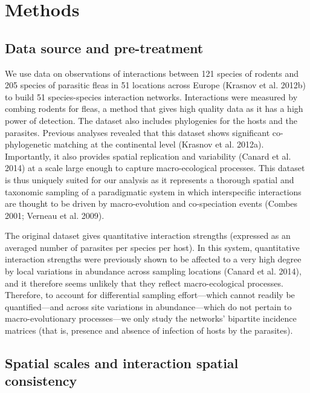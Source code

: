 \documentclass[12pt]{article}
\begin{document}
\section{Methods}\label{methods}

\subsection{Data source and
pre-treatment}\label{data-source-and-pre-treatment}

We use data on observations of interactions between 121 species of
rodents and 205 species of parasitic fleas in 51 locations across Europe
(Krasnov et al. 2012b) to build 51 species-species interaction networks.
Interactions were measured by combing rodents for fleas, a method that
gives high quality data as it has a high power of detection. The dataset
also includes phylogenies for the hosts and the parasites. Previous
analyses revealed that this dataset shows significant co-phylogenetic
matching at the continental level (Krasnov et al. 2012a). Importantly,
it also provides spatial replication and variability (Canard et al.
2014) at a scale large enough to capture macro-ecological processes.
This dataset is thus uniquely suited for our analysis as it represents a
thorough spatial and taxonomic sampling of a paradigmatic system in
which interspecific interactions are thought to be driven by
macro-evolution and co-speciation events (Combes 2001; Verneau et al.
2009).

The original dataset gives quantitative interaction strengths (expressed
as an averaged number of parasites per species per host). In this
system, quantitative interaction strengths were previously shown to be
affected to a very high degree by local variations in abundance across
sampling locations (Canard et al. 2014), and it therefore seems unlikely
that they reflect macro-ecological processes. Therefore, to account for
differential sampling effort---which cannot readily be quantified---and
across site variations in abundance---which do not pertain to
macro-evolutionary processes---we only study the networks' bipartite
incidence matrices (that is, presence and absence of infection of hosts
by the parasites).

\subsection{Spatial scales and interaction spatial
consistency}\label{spatial-scales-and-interaction-spatial-consistency}
\end{document}
